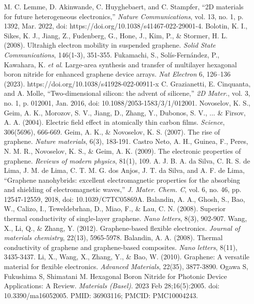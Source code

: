 \documentclass[conference]{IEEEtran}
\begin{document}
\begin{thebibliography}{00}
   M. C. Lemme, D. Akinwande, C. Huyghebaert, and C. Stampfer, ``2D materials for future heterogeneous electronics,'' \textit{Nature Communications}, vol. 13, no. 1, p. 1392, Mar. 2022, doi: https://doi.org/10.1038/s41467-022-29001-4.
   Bolotin, K. I., Sikes, K. J., Jiang, Z., Fudenberg, G., Hone, J., Kim, P., \& Stormer, H. L. (2008). Ultrahigh electron mobility in suspended graphene. \textit{Solid State Communications}, 146(1-3), 351-355.
   Fukamachi, S., Sol\'is-Fern\'andez, P., Kawahara, K. \textit{et al}. Large-area synthesis and transfer of multilayer hexagonal boron nitride for enhanced graphene device arrays. \textit{Nat Electron} 6, 126–136 (2023). https://doi.org/10.1038/s41928-022-00911-x
   C. Grazianetti, E. Cinquanta, and A. Molle, ``Two-dimensional silicon: the advent of silicene,'' \textit{2D Mater}., vol. 3, no. 1, p. 012001, Jan. 2016, doi: 10.1088/2053-1583/3/1/012001.
   Novoselov, K. S., Geim, A. K., Morozov, S. V., Jiang, D., Zhang, Y., Dubonos, S. V., ... \& Firsov, A. A. (2004). Electric field effect in atomically thin carbon films. \textit{Science}, 306(5696), 666-669.
   Geim, A. K., \& Novoselov, K. S. (2007). The rise of graphene. \textit{Nature materials}, 6(3), 183-191.
   Castro Neto, A. H., Guinea, F., Peres, N. M. R., Novoselov, K. S., \& Geim, A. K. (2009). The electronic properties of graphene. \textit{Reviews of modern physics}, 81(1), 109.
   A. J. B. A. da Silva, C. R. S. de Lima, J. M. de Lima, C. T. M. G. dos Anjos, J. T. da Silva, and A. F. de Lima, ``Graphene nanohybrids: excellent electromagnetic properties for the absorbing and shielding of electromagnetic waves,'' \textit{J. Mater. Chem. C}, vol. 6, no. 46, pp. 12547-12559, 2018, doi: 10.1039/C7TC05869A.
   Balandin, A. A., Ghosh, S., Bao, W., Calizo, I., Teweldebrhan, D., Miao, F., \& Lau, C. N. (2008). Superior thermal conductivity of single-layer graphene. \textit{Nano letters}, 8(3), 902-907.
   Wang, X., Li, Q., \& Zhang, Y. (2012). Graphene-based flexible electronics. \textit{Journal of materials chemistry}, 22(13), 5965-5978.
   Balandin, A. A. (2008). Thermal conductivity of graphene and graphene-based composites. \textit{Nano letters}, 8(11), 3435-3437.
   Li, X., Wang, X., Zhang, Y., \& Bao, W. (2010). Graphene: A versatile material for flexible electronics. \textit{Advanced Materials}, 22(35), 3877-3890.
   Ogawa S, Fukushima S, Shimatani M. Hexagonal Boron Nitride for Photonic Device Applications: A Review. \textit{Materials (Basel)}. 2023 Feb 28;16(5):2005. doi: 10.3390/ma16052005. PMID: 36903116; PMCID: PMC10004243. 

\end{thebibliography}
\end{document}
